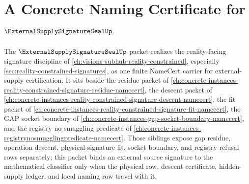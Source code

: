 \chapter{A Concrete Naming Certificate for $\ExternalSupplySignatureSealUp$}
\label{ch:concrete-instances-external-supply-signature-seal-namecert}

The $\ExternalSupplySignatureSealUp$ packet realizes the reality-facing signature discipline of \autoref{ch:visions-subhub-reality-constrained}, especially \autoref{sec:reality-constrained-signatures}, as one finite NameCert carrier for external-supply certification. It sits beside the residue packet of \autoref{ch:concrete-instances-reality-constrained-signature-residue-namecert}, the descent packet of \autoref{ch:concrete-instances-reality-constrained-signature-descent-namecert}, the fit packet of \autoref{ch:concrete-instances-reality-constrained-signature-fit-namecert}, the GAP socket boundary of \autoref{ch:concrete-instances-gap-socket-boundary-namecert}, and the registry no-smuggling predicate of \autoref{ch:concrete-instances-registrynosmugglingpredicate-namecert}. Those siblings expose gap residue, operation descent, physical-signature fit, socket boundary, and registry refusal rows separately; this packet binds an external source signature to the mathematical classifier only when the physical row, descent certificate, hidden-supply ledger, and local naming row travel with it.



